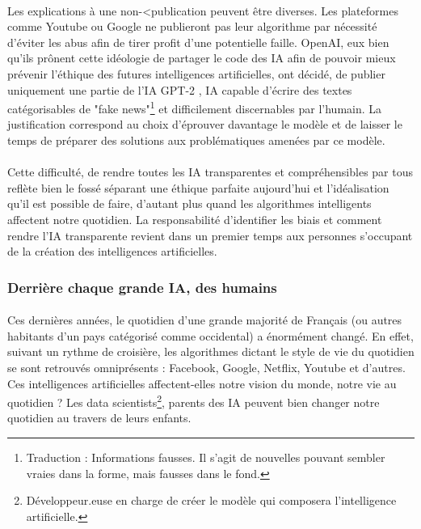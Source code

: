 \documentclass[10pt, french, a4paper]{article}
\begin{document}
\paragraph{}
Les explications à une non-<publication peuvent être diverses. Les plateformes comme Youtube ou Google ne publieront pas leur algorithme par nécessité d’éviter les abus afin de tirer profit d’une potentielle faille. OpenAI, eux bien qu’ils prônent cette idéologie de partager le code des IA afin de pouvoir mieux prévenir l’éthique des futures intelligences artificielles, ont décidé, de publier uniquement une partie de l’IA GPT-2 \citep{radford_language_2019}, IA capable d’écrire des textes catégorisables de "fake news"\footnote{Traduction : Informations fausses. Il s’agit de nouvelles pouvant sembler vraies dans la forme, mais fausses dans le fond.} et difficilement discernables par l’humain. La justification correspond au choix d’éprouver davantage le modèle et de laisser le temps de préparer des solutions aux problématiques amenées par ce modèle.

\paragraph{}
Cette difficulté, de rendre toutes les IA transparentes et compréhensibles par tous reflète bien le fossé séparant une éthique parfaite aujourd’hui et l’idéalisation qu’il est possible de faire, d’autant plus quand les algorithmes intelligents affectent notre quotidien. La responsabilité d’identifier les biais et comment rendre l’IA transparente revient dans un premier temps aux personnes s’occupant de la création des intelligences artificielles.

\subsubsection{Derrière chaque grande IA, des humains}

\paragraph{}
Ces dernières années, le quotidien d’une grande majorité de Français (ou autres habitants d’un pays catégorisé comme occidental) a énormément changé. En effet, suivant un rythme de croisière, les algorithmes dictant le style de vie du quotidien se sont retrouvés omniprésents : Facebook, Google, Netflix, Youtube et d’autres. Ces intelligences artificielles affectent-elles notre vision du monde, notre vie au quotidien ? Les data scientists\footnote{Développeur.euse en charge de créer le modèle qui composera l’intelligence artificielle.}, parents des IA peuvent bien changer notre quotidien au travers de leurs enfants.
\end{document}
